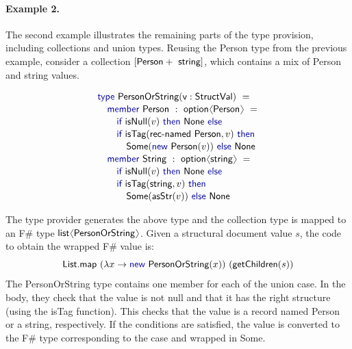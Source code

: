 \documentclass[preprint]{sigplanconf}
\newcommand{\langl}{\begin{picture}(4.5,7)
\put(1.1,2.5){\rotatebox{60}{\line(1,0){5.5}}}
\put(1.1,2.5){\rotatebox{300}{\line(1,0){5.5}}}
\end{picture}}
\newcommand{\rangl}{\begin{picture}(4.5,7)
\put(.9,2.5){\rotatebox{120}{\line(1,0){5.5}}}
\put(.9,2.5){\rotatebox{240}{\line(1,0){5.5}}}
\end{picture}}
\newcommand{\kvd}[1]{\textnormal{\textcolor{kvdclr}{\sffamily #1}}}
\newcommand{\ident}[1]{\textnormal{\sffamily #1}}
\begin{document}
\paragraph{Example 2.} The second example illustrates the remaining parts of the type provision,
including collections and union types. Reusing the \ident{Person} type from the previous example,
consider a collection $[\ident{Person}+\ident{string}]$, which contains a mix of \ident{Person} and string values.

\noindent
\begin{equation*}
\begin{array}{l}
 \kvd{type}~\ident{PersonOrString}(\ident{v}:\ident{StructVal})~= \\[0.1em]
 \quad \kvd{member}~\ident{Person}~:~\ident{option}\langl\ident{Person}\rangl~= \\[0.1em]
 \qquad \kvd{if}~\ident{isNull}(v)~\kvd{then}~\ident{None}~\kvd{else} \\[0.1em]
 \qquad \kvd{if}~\ident{isTag}(\ident{rec-named Person}, v)~\kvd{then}~\\[0.1em]
 \qquad\quad \ident{Some}(\kvd{new}~\ident{Person}(v))~\kvd{else}~\ident{None} \\[0.1em]
 \quad \kvd{member}~\ident{String}~:~\ident{option}\langl\ident{string}\rangl~= \\[0.1em]
 \qquad \kvd{if}~\ident{isNull}(v)~\kvd{then}~\ident{None}~\kvd{else} \\[0.1em]
 \qquad \kvd{if}~\ident{isTag}(\ident{string}, v)~\kvd{then}~\\[0.1em]
 \qquad\quad \ident{Some}(\ident{asStr}(v))~\kvd{else}~\ident{None}
\end{array}
\end{equation*}

\noindent
The type provider generates the above type and the collection type is mapped to an F\# type 
$\ident{list}\langl\ident{PersonOrString}\rangl$. Given a structural document value $s$, the code
to obtain the wrapped F\# value is:
%
\begin{equation*}
\ident{List.map}~(\lambda x\rightarrow\kvd{new}~\ident{PersonOrString}(x))~(\ident{getChildren}(s))
\end{equation*}
%
The \ident{PersonOrString} type contains one member for each of the union case. In the body, they
check that the value is not \kvd{null} and that it has the right structure (using the \ident{isTag}
function). This checks that the value is a record named \ident{Person} or a string, respectively.
If the conditions are satisfied, the value is converted to the F\# type corresponding to the case
and wrapped in \ident{Some}.
\end{document}
